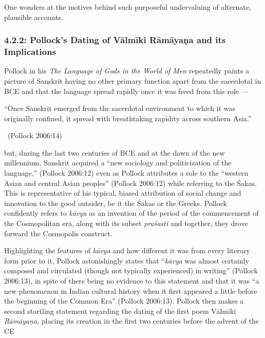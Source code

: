 One wonders at the motives behind such purposeful undervaluing of alternate, plausible accounts.

\vspace{-.4cm}

\subsubsection*{4.2.2: Pollock’s Dating of Vālmīki Rāmāyaṇa and its Implications}

\vspace{-.2cm}

Pollock in his \textit{The Language of Gods in the World of Men} repeatedly paints a picture of Sanskrit having no other primary function apart from the sacerdotal in BCE and that the language spread rapidly once it was freed from this role —

\begin{myquote}
“Once Sanskrit emerged from the sacerdotal environment to which it was originally confined, it spread with breathtaking rapidity across southern Asia.” 

~\hfill (Pollock 2006:14)
\end{myquote}

but, during the last two centuries of BCE and at the dawn of the new millennium, Sanskrit acquired a “new sociology and politicization of the language,” (Pollock 2006:12) even as Pollock attributes a role to the “western Asian and central Asian peoples” (Pollock 2006:12) while referring to the Śakas. This is representative of his typical, biased attribution of social change and innovation to the good outsider, be it the Śakas or the Greeks. Pollock confidently refers to \textit{kāvya} as an invention of the period of the commencement of the Cosmopolitan era, along with its subset \textit{praśasti} and together, they drove forward the Cosmopolis construct.

Highlighting the features of \textit{kāvya} and how different it was from every literary form prior to it, Pollock astonishingly states that “\textit{kāvya} was almost certainly composed and circulated (though not typically experienced) in writing” (Pollock 2006:13), in spite of there being no evidence to this statement and that it was “a new phenomenon in Indian cultural history when it first appeared a little before the beginning of the Common Era” (Pollock 2006:13). Pollock then makes a second startling statement regarding the dating of the first poem Vālmīki \textit{Rāmāyaṇa}, placing its creation in the first two centuries before the advent of the CE

